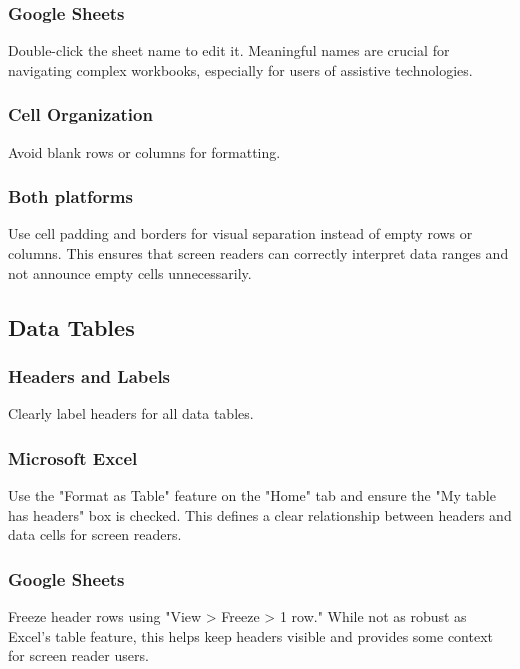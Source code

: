 \subsubsection{Google Sheets}\label{ch15:sssec:sheets-sheet-structure}
Double-click the sheet name to edit it. Meaningful names are crucial for navigating complex workbooks, especially for users of assistive technologies.

\subsubsection{Cell Organization}\label{ch15:sssec:cell-org}
Avoid blank rows or columns for formatting.

\subsubsection{Both platforms}\label{ch15:sssec:cell-org-both}
Use cell padding and borders for visual separation instead of empty rows or columns. This ensures that screen readers can correctly interpret data ranges and not announce empty cells unnecessarily.

\subsection{Data Tables}\label{ch15:ssec:data-tables}

\subsubsection{Headers and Labels}\label{ch15:sssec:headers-labels}
Clearly label headers for all data tables.

\subsubsection{Microsoft Excel}\label{ch15:sssec:excel-headers-labels}
Use the "Format as Table" feature on the "Home" tab and ensure the "My table has headers" box is checked. This defines a clear relationship between headers and data cells for screen readers.

\subsubsection{Google Sheets}\label{ch15:sssec:sheets-headers-labels}
Freeze header rows using "View > Freeze > 1 row." While not as robust as Excel's table feature, this helps keep headers visible and provides some context for screen reader users.

